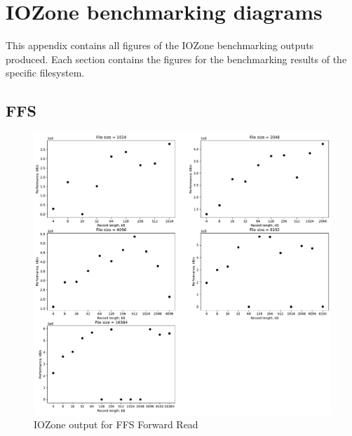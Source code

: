 \chapter{IOZone benchmarking diagrams}
This appendix contains all figures of the IOZone benchmarking outputs produced. Each section contains the figures for the benchmarking results of the specific filesystem.

\section{FFS}
\begin{figure}[!htb]
	\label{fig:app_bench_ffs_rnd_read}
	\begin{center}
		\includegraphics[width=1.0\textwidth]{figures/benchmarking/ffs/Reader.pdf}
	\end{center}
	\caption{IOZone output for FFS Forward Read}
\end{figure}

